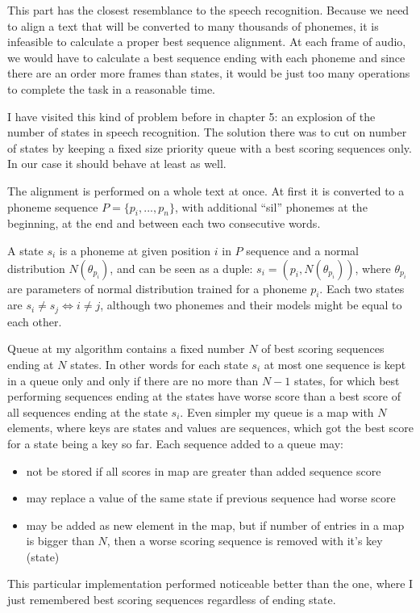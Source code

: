 \documentclass[12pt,a4paper,english]{article}
\begin{document}
This part has the closest resemblance to the speech recognition. Because we need to align a text that will be converted to many thousands of phonemes, it is infeasible to calculate a proper best sequence alignment. At each frame of audio, we would have to calculate a best sequence ending with each phoneme and since there are an order more frames than states, it would be just too many operations to complete the task in a reasonable time. \newline

I have visited this kind of problem before in chapter 5: an explosion of the number of states in speech recognition. The solution there was to cut on number of states by keeping a fixed size priority queue with a best scoring sequences only. In our case it should behave at least as well. \newline

The alignment is performed on a whole text at once. At first it is converted to a phoneme sequence $P = \{p_i, ..., p_n\}$, with additional “sil” phonemes at the beginning, at the end and between each two consecutive words. \newline

A state $s_i$ is a phoneme at given position $i$ in $P$ sequence and a normal distribution $N(\theta_{p_i})$,
and can be seen as a duple: $s_i = (p_i, N(\theta_{p_i}))$, where $\theta_{p_i}$ are parameters of normal distribution trained for a phoneme $p_i$. \newline
Each two states are $s_i \neq s_j \iff i \neq j$, although two phonemes and their models might be equal to each other. \newline

Queue at my algorithm contains a fixed number $N$ of best scoring sequences ending at $N$ states. \newline
In other words for each state $s_i$ at most one sequence is kept in a queue only and only if there are no more than $N-1$ states, for which best performing sequences ending at the states have worse score than a best score of all sequences ending at the state $s_i$. \newline
Even simpler my queue is a map with $N$ elements, where keys are states and values are sequences, which got the best score for a state being a key so far. \newline
Each sequence added to a queue may:
\begin{itemize}
    \item not be stored if all scores in map are greater than added sequence score
    \item may replace a value of the same state if previous sequence had worse score
    \item may be added as new element in the map, but if number of entries in a map is bigger than $N$, then a worse scoring sequence is removed with it's key (state)
\end{itemize}
This particular implementation performed noticeable better than the one, where I just remembered best scoring sequences regardless of ending state. \newline
\end{document}
